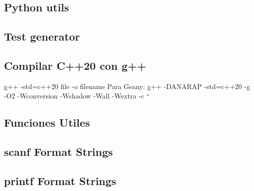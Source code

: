 \subsection{Python utils}

\subsection{Test generator}

\subsection{Compilar C++20 con g++}
\begin{code}
g++ -std=c++20 {file} -o {filename}
Para Geany: g++ -DANARAP -std=c++20 -g -O2 -Wconversion -Wshadow -Wall -Wextra -c “%
\end{code}
%
\subsection{Funciones Utiles}

\subsection{scanf Format Strings}

\subsection{printf Format Strings}

